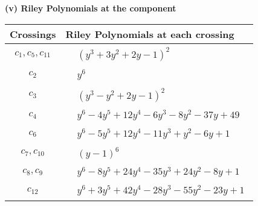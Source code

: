 \documentclass[1p]{elsarticle_modified}
\theoremstyle{definition}
\begin{document}
\newpage\renewcommand{\arraystretch}{1}
\flushleft \textbf{(v) Riley Polynomials at the component}\newline \\
\begin{tabular}{m{50pt}|m{274pt}}
Crossings & \hspace{64pt}Riley Polynomials at each crossing \\
\hline $$\begin{aligned}c_{1},c_{5},c_{11}\end{aligned}$$&$\begin{aligned}
&(y^3+3 y^2+2 y-1)^2
\end{aligned}$\\
\hline $$\begin{aligned}c_{2}\end{aligned}$$&$\begin{aligned}
&y^6
\end{aligned}$\\
\hline $$\begin{aligned}c_{3}\end{aligned}$$&$\begin{aligned}
&(y^3- y^2+2 y-1)^2
\end{aligned}$\\
\hline $$\begin{aligned}c_{4}\end{aligned}$$&$\begin{aligned}
&y^6-4 y^5+12 y^4-6 y^3-8 y^2-37 y+49
\end{aligned}$\\
\hline $$\begin{aligned}c_{6}\end{aligned}$$&$\begin{aligned}
&y^6-5 y^5+12 y^4-11 y^3+y^2-6 y+1
\end{aligned}$\\
\hline $$\begin{aligned}c_{7},c_{10}\end{aligned}$$&$\begin{aligned}
&(y-1)^6
\end{aligned}$\\
\hline $$\begin{aligned}c_{8},c_{9}\end{aligned}$$&$\begin{aligned}
&y^6-8 y^5+24 y^4-35 y^3+24 y^2-8 y+1
\end{aligned}$\\
\hline $$\begin{aligned}c_{12}\end{aligned}$$&$\begin{aligned}
&y^6+3 y^5+42 y^4-28 y^3-55 y^2-23 y+1
\end{aligned}$\\
\hline
\end{tabular}\\~\\
\end{document}
